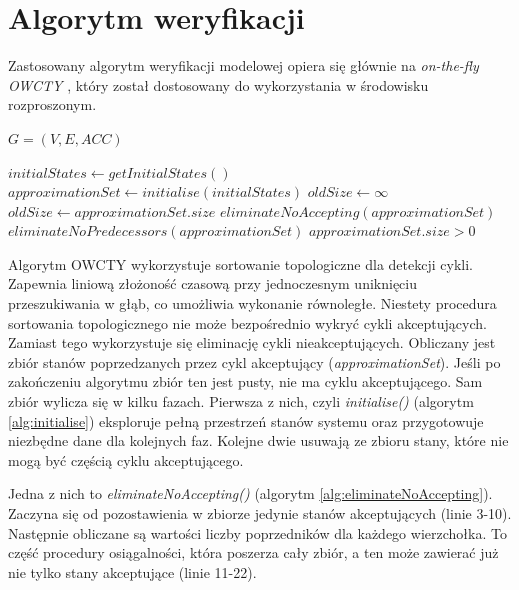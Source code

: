 \chapter{Algorytm weryfikacji}

Zastosowany algorytm weryfikacji modelowej opiera się głównie na \textit{on-the-fly OWCTY} \cite{Bar12}, który został dostosowany do wykorzystania w środowisku rozproszonym.

\begin{algorithm}
\caption{$ detectAcceptingCycle() $}
\label{alg:detectAcceptingCycle}
\begin{algorithmic}[1]
\REQUIRE $ G = (V,E,ACC) $

\STATE $ initialStates \leftarrow getInitialStates() $
\STATE $ approximationSet \leftarrow initialise(initialStates) $
\STATE $ oldSize \leftarrow \infty $
  \STATE $ oldSize \leftarrow approximationSet.size $
  \STATE $ eliminateNoAccepting(approximationSet) $
  \STATE $ eliminateNoPredecessors(approximationSet) $
\ENDWHILE
\RETURN $ approximationSet.size > 0 $
\end{algorithmic}
\end{algorithm}

Algorytm OWCTY wykorzystuje sortowanie topologiczne dla detekcji cykli.
Zapewnia liniową złożoność czasową przy jednoczesnym uniknięciu przeszukiwania w głąb, co umożliwia wykonanie równoległe.
Niestety procedura sortowania topologicznego nie może bezpośrednio wykryć cykli akceptujących.
Zamiast tego wykorzystuje się eliminację cykli nieakceptujących.
Obliczany jest zbiór stanów poprzedzanych przez cykl akceptujący (\textit{approximationSet}).
Jeśli po zakończeniu algorytmu zbiór ten jest pusty, nie ma cyklu akceptującego.
Sam zbiór wylicza się w kilku fazach.
Pierwsza z nich, czyli \textit{initialise()} (algorytm \ref{alg:initialise}) eksploruje pełną przestrzeń stanów systemu oraz przygotowuje niezbędne dane dla kolejnych faz.
Kolejne dwie usuwają ze zbioru stany, które nie mogą być częścią cyklu akceptującego.

Jedna z nich to \textit{eliminateNoAccepting()} (algorytm \ref{alg:eliminateNoAccepting}).
Zaczyna się od pozostawienia w zbiorze jedynie stanów akceptujących (linie 3-10).
Następnie obliczane są wartości liczby poprzedników dla każdego wierzchołka.
To część procedury osiągalności, która poszerza cały zbiór, a ten może zawierać już nie tylko stany akceptujące (linie 11-22).

